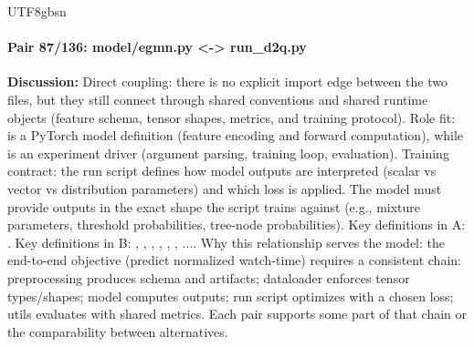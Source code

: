\documentclass[11pt]{article}
\begin{document}
\begin{CJK*}{UTF8}{gbsn}
\paragraph{Pair 87/136: model/egmn.py <-> run\_d2q.py}
\textbf{Discussion:} Direct coupling: there is no explicit import edge between the two files, but they still connect through shared conventions and shared runtime objects (feature schema, tensor shapes, metrics, and training protocol). Role fit: \texttt{} is a PyTorch model definition (feature encoding and forward computation), while \texttt{} is an experiment driver (argument parsing, training loop, evaluation). Training contract: the run script defines how model outputs are interpreted (scalar vs vector vs distribution parameters) and which loss is applied. The model must provide outputs in the exact shape the script trains against (e.g., mixture parameters, threshold probabilities, tree-node probabilities). Key definitions in A: \texttt{}. Key definitions in B: \texttt{}, \texttt{}, \texttt{}, \texttt{}, \texttt{}, \texttt{}, .... Why this relationship serves the model: the end-to-end objective (predict normalized watch-time) requires a consistent chain: preprocessing produces schema and artifacts; dataloader enforces tensor types/shapes; model computes outputs; run script optimizes with a chosen loss; utils evaluates with shared metrics. Each pair supports some part of that chain or the comparability between alternatives.


\end{CJK*}
\end{document}
